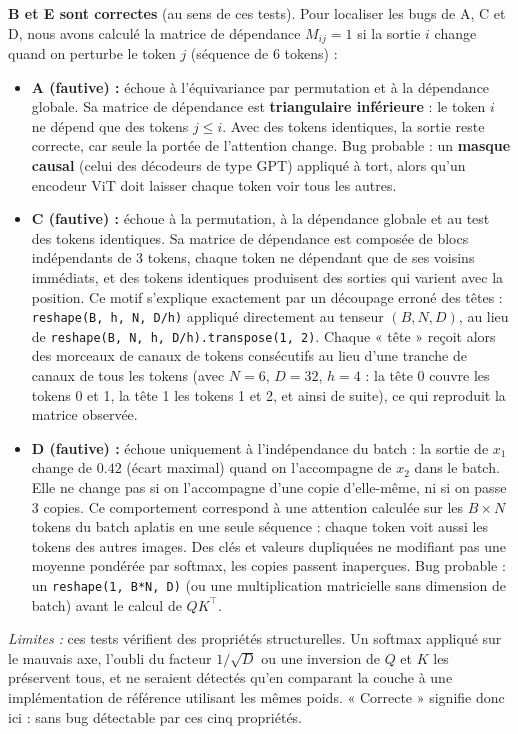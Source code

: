 \documentclass{report}
\begin{document}
\textbf{B et E sont correctes} (au sens de ces tests). Pour localiser les bugs de A, C et D, nous avons calculé la matrice de dépendance $M_{ij} = 1$ si la sortie $i$ change quand on perturbe le token $j$ (séquence de 6 tokens) :
\begin{itemize}
    \item \textbf{A (fautive) :} échoue à l'équivariance par permutation et à la dépendance globale. Sa matrice de dépendance est \textbf{triangulaire inférieure} : le token $i$ ne dépend que des tokens $j \leq i$. Avec des tokens identiques, la sortie reste correcte, car seule la portée de l'attention change. Bug probable : un \textbf{masque causal} (celui des décodeurs de type GPT) appliqué à tort, alors qu'un encodeur ViT doit laisser chaque token voir tous les autres.
    \item \textbf{C (fautive) :} échoue à la permutation, à la dépendance globale et au test des tokens identiques. Sa matrice de dépendance est composée de blocs indépendants de 3 tokens, chaque token ne dépendant que de ses voisins immédiats, et des tokens identiques produisent des sorties qui varient avec la position. Ce motif s'explique exactement par un découpage erroné des têtes : \texttt{reshape(B, h, N, D/h)} appliqué directement au tenseur $(B, N, D)$, au lieu de \texttt{reshape(B, N, h, D/h).transpose(1, 2)}. Chaque « tête » reçoit alors des morceaux de canaux de tokens consécutifs au lieu d'une tranche de canaux de tous les tokens (avec $N = 6$, $D = 32$, $h = 4$ : la tête 0 couvre les tokens 0 et 1, la tête 1 les tokens 1 et 2, et ainsi de suite), ce qui reproduit la matrice observée.
    \item \textbf{D (fautive) :} échoue uniquement à l'indépendance du batch : la sortie de $x_1$ change de $0.42$ (écart maximal) quand on l'accompagne de $x_2$ dans le batch. Elle ne change pas si on l'accompagne d'une copie d'elle-même, ni si on passe 3 copies. Ce comportement correspond à une attention calculée sur les $B \times N$ tokens du batch aplatis en une seule séquence : chaque token voit aussi les tokens des autres images. Des clés et valeurs dupliquées ne modifiant pas une moyenne pondérée par softmax, les copies passent inaperçues. Bug probable : un \texttt{reshape(1, B*N, D)} (ou une multiplication matricielle sans dimension de batch) avant le calcul de $QK^\top$.
\end{itemize}

\textit{Limites :} ces tests vérifient des propriétés structurelles. Un softmax appliqué sur le mauvais axe, l'oubli du facteur $1/\sqrt{D}$ ou une inversion de $Q$ et $K$ les préservent tous, et ne seraient détectés qu'en comparant la couche à une implémentation de référence utilisant les mêmes poids. « Correcte » signifie donc ici : sans bug détectable par ces cinq propriétés.
\end{document}
